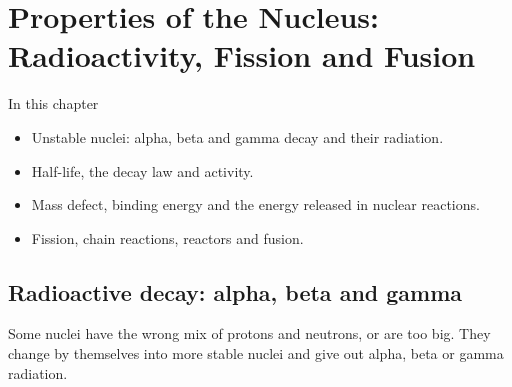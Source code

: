 \chapter[Properties of the Nucleus]{Properties of the Nucleus: Radioactivity, Fission and Fusion}\label{ch4:chap}

\newcommand\chFourNuc[3]{\ensuremath{\mathord{%
  \setbox0=\hbox{$\scriptstyle#1$}\setbox2=\hbox{$\scriptstyle#2$}%
  \ifdim\wd0<\wd2 \setbox0=\hbox to\wd2{\hss\box0}\else\setbox2=\hbox to\wd0{\hss\box2}\fi
  {}^{\box0}_{\box2}\mathrm{#3}}}}
\newcommand\chFourAlpha{\chFourNuc{4}{2}{He}}
\newcommand\chFourBeta{\chFourNuc{0}{-1}{e}}
\newcommand\chFourPos{\chFourNuc{0}{+1}{e}}
\newcommand\chFourNeut{\chFourNuc{1}{0}{n}}
\newcommand\chFourGam{\ensuremath{{}^{0}_{0}\gamma}}
\newcommand\chFourAnu{\ensuremath{\overline{\nu}_\mathrm{e}}}
\newcommand\chFourNu{\ensuremath{\nu_\mathrm{e}}}

\begin{summarybox}{In this chapter}
\begin{itemize}
  \item Unstable nuclei: alpha, beta and gamma decay and their radiation.
  \item Half-life, the decay law and activity.
  \item Mass defect, binding energy and the energy released in nuclear reactions.
  \item Fission, chain reactions, reactors and fusion.
\end{itemize}
\end{summarybox}

\section{Radioactive decay: alpha, beta and gamma}\label{ch4:sec:decay}

\begin{bigidea}
Some nuclei have the wrong mix of protons and neutrons, or are too big. They change by
themselves into more stable nuclei and give out alpha, beta or gamma radiation.
\end{bigidea}

